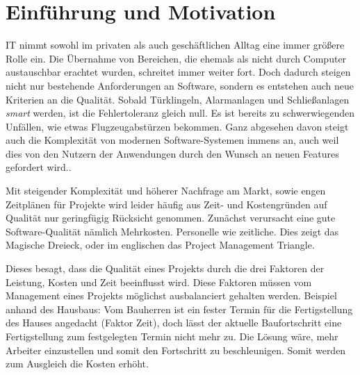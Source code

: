 \documentclass[12pt,a4paper,bibliography=totocnumbered,listof=totocnumbered]{scrartcl}
\begin{document}
\onehalfspacing
\renewcommand{\thesection}{\arabic{section}}
\renewcommand{\theHsection}{\arabic{section}}
\setcounter{section}{0}
\setcounter{page}{1}
\setcounter{secnumdepth}{6}

\section{Einführung und Motivation}

IT nimmt sowohl im privaten als auch geschäftlichen Alltag eine immer größere Rolle ein. Die Übernahme von Bereichen, die ehemals als nicht durch Computer austauschbar erachtet wurden, schreitet immer weiter fort. Doch dadurch steigen nicht nur bestehende Anforderungen an Software, sondern es entstehen auch neue Kriterien an die Qualität. Sobald Türklingeln, Alarmanlagen und Schließanlagen \textit{smart} werden, ist die Fehlertoleranz gleich null. Es ist bereits zu schwerwiegenden Unfällen, wie etwas Flugzeugabstürzen bekommen.\cite{pantesting} Ganz abgesehen davon steigt auch die Komplexität von modernen Software-Systemen immens an, auch weil dies von den Nutzern der Anwendungen durch den Wunsch an neuen Features gefordert wird.\cite{pantesting}.

Mit steigender Komplexität und höherer Nachfrage am Markt, sowie engen Zeitplänen für Projekte wird leider häufig aus Zeit- und Kostengründen auf Qualität nur geringfügig Rücksicht genommen. Zunächst verursacht eine gute Software-Qualität nämlich Mehrkosten. Personelle wie zeitliche. Dies zeigt das Magische Dreieck, oder im englischen das Project Management Triangle.


Dieses besagt, dass die Qualität eines Projekts durch die drei Faktoren der Leistung, Kosten und Zeit beeinflusst wird. Diese Faktoren müssen vom Management eines Projekts möglichst ausbalanciert gehalten werden. Beispiel anhand des Hausbaus: Vom Bauherren ist ein fester Termin für die Fertigstellung des Hauses angedacht (Faktor Zeit), doch lässt der aktuelle Baufortschritt eine Fertigstellung zum festgelegten Termin nicht mehr zu. Die Lösung wäre, mehr Arbeiter einzustellen und somit den Fortschritt zu beschleunigen. Somit werden zum Ausgleich die Kosten erhöht.
\end{document}
